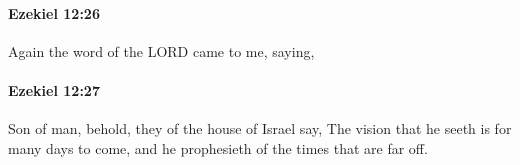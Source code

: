 		\paragraph{Ezekiel 12:26} %
			\label{EZEKIEL-12-26}

			Again the word of the LORD came to me, saying,


		\paragraph{Ezekiel 12:27} %
			\label{EZEKIEL-12-27}

			Son of man, behold, they of the house of Israel say, The vision that he seeth is for many days to come, and he prophesieth of the times that are far off.


